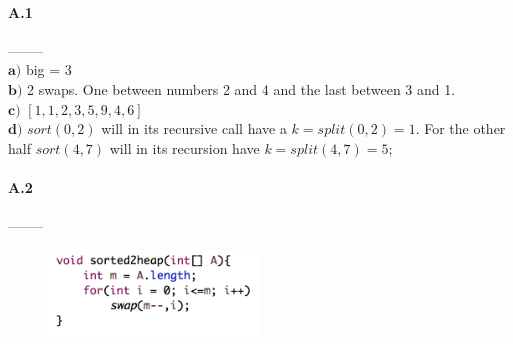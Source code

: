 \documentclass{article}
\begin{document}
 
\paragraph{A.1}  --------\\
	\(\textbf{a)}\) big = 3\\ 
	\(\textbf{b)}\) 2 swaps. One between numbers 2 and 4 and the last between 3 and 1. \\ 
	\(\textbf{c)}\) \([1,1,2,3,5,9,4,6]\)\\
	\(\textbf{d)}\) \(sort(0,2)\) will in its recursive call have a \(k =  split(0, 2) = 1\). For the other half \(sort(4,7)\) will in its recursion have \(k = split(4, 7) = 5\);\\
	
\paragraph{A.2} --------\\
\begin{figure}[h]
\includegraphics[width=0.5\textwidth, inner]{Hw7fig}
\end{figure}
 
 
\end{document}
